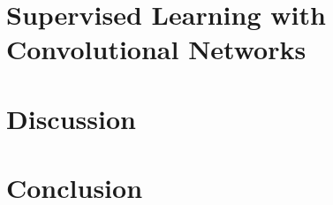 \documentclass[letterpaper,12pt]{article}
\begin{document}
\section{Supervised Learning with Convolutional Networks}
\newpage

\section{Discussion}
\label{sec:discussion}
\newpage

\section{Conclusion}
\label{sec:conclusion}
\newpage



\end{document}
